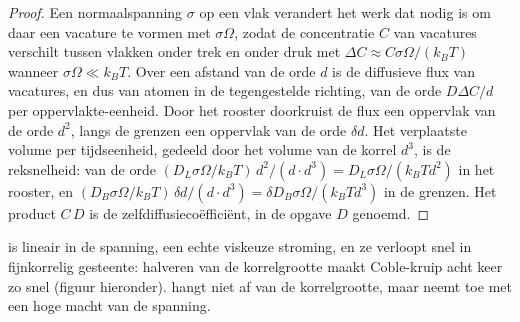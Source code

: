 \begin{proof}
Een normaalspanning $\sigma$ op een vlak verandert het werk dat nodig is om daar een vacature te vormen
met $\sigma\Omega$, zodat de concentratie $C$ van vacatures verschilt tussen vlakken
onder trek en onder druk met $\Delta C \approx C\sigma\Omega/
(k_BT)$ wanneer $\sigma\Omega \ll k_BT$. Over een afstand van de orde $d$ is de
diffusieve flux van vacatures, en dus van atomen in de tegengestelde richting, van de orde $D\Delta
C/d$ per oppervlakte-eenheid. Door het rooster doorkruist de flux een oppervlak van de orde
$d^2$, langs de grenzen een oppervlak van de orde $\delta d$. Het verplaatste volume per
tijdseenheid, gedeeld door het volume van de korrel $d^3$, is de reksnelheid: van de orde
$(D_L\sigma\Omega/k_BT)\,d^2/(d\cdot d^3) = D_L\sigma\Omega/(k_BTd^2)$ in het
rooster, en $(D_B\sigma\Omega/k_BT)\,\delta d/(d\cdot d^3) = \delta D_B
\sigma\Omega/(k_BTd^3)$ in de grenzen. Het product $C\,D$ is de
zelfdiffusiecoëfficiënt, in de opgave $D$ genoemd.
\end{proof}

 is lineair in de spanning, een echte viskeuze stroming, en ze verloopt snel in
fijnkorrelig gesteente: halveren van de korrelgrootte maakt Coble-kruip acht keer zo snel
(figuur hieronder).  hangt niet af van de korrelgrootte, maar neemt toe
met een hoge macht van de spanning.

